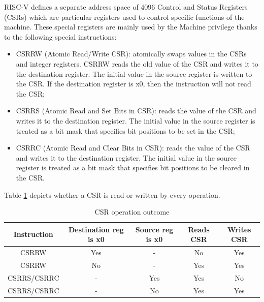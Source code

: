 RISC-V defines a separate address space of 4096 Control and Status Registers (CSRs)
which are particular registers used to control specific functions of the machine.
These special registers are mainly used by the Machine privilege thanks to the following
special instructions:
\begin{itemize}
  \item CSRRW (Atomic Read/Write CSR): atomically swaps values in the CSRs and
    integer registers. CSRRW reads the old value of the CSR and writes it to the
    destination register. The initial value in the source register is written to
    the CSR. If the destination register is x0, then the instruction will not
    read the CSR;

  \item CSRRS (Atomic Read and Set Bits in CSR): reads the value of the CSR and
    writes it to the destination register. The initial value in the source register
    is treated as a bit mask that specifies bit positions to be set in the CSR;

  \item CSRRC (Atomic Read and Clear Bits in CSR): reads the value of the CSR
    and writes it to the destination register. The initial value in the source register
    is treated as a bit mask that specifies bit positions to be cleared in the CSR.
\end{itemize}

Table \ref{tab:csrop} depicts whether a CSR is read or written by every operation.
\begin{table}
  \centering
  \begin{tabular}{|c|c|c|c|c|}
    \hline
    \textbf{Instruction} & \textbf{Destination reg is x0} & \textbf{Source reg is x0} & \textbf{Reads CSR} & \textbf{Writes CSR} \\
    \hline
    CSRRW                & Yes                            & -                         & No                 & Yes                 \\
    \hline
    CSRRW                & No                             & -                         & Yes                & Yes                 \\
    \hline
    CSRRS/CSRRC          & -                              & Yes                       & Yes                & No                  \\
    \hline
    CSRRS/CSRRC          & -                              & No                        & Yes                & Yes                 \\
    \hline
  \end{tabular}
  \caption{CSR operation outcome}
  \label{tab:csrop}
\end{table}

